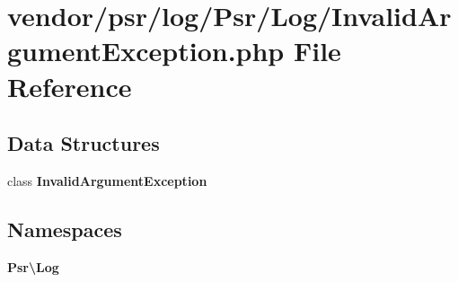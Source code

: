 \section{vendor/psr/log/\+Psr/\+Log/\+Invalid\+Argument\+Exception.php File Reference}
\label{psr_2log_2_psr_2_log_2_invalid_argument_exception_8php}
\subsection*{Data Structures}
\begin{DoxyCompactItemize}
\item 
class {\bf Invalid\+Argument\+Exception}
\end{DoxyCompactItemize}
\subsection*{Namespaces}
\begin{DoxyCompactItemize}
\item 
 {\bf Psr\textbackslash{}\+Log}
\end{DoxyCompactItemize}
